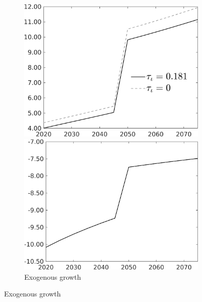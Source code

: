 \begin{figure}[h!!]
	\begin{subfigure}{0.7\textwidth}
		\caption{Exogenous growth}
		\begin{minipage}[]{0.45\textwidth}
			\includegraphics[width=1\textwidth]{../../codding_model/own_basedOnFried/optimalPol_010922_revision/figures/all_13Sept22/CompTauf_bytaul_Reg0_tauf_spillover0_nsk1_xgr0_knspil0_sep0_LFlimit1_emsbase0_countec0_GovRev0_etaa0.79_lgd1.png}
		\end{minipage}	
		\begin{minipage}[]{0.45\textwidth}
			\includegraphics[width=1\textwidth]{../../codding_model/own_basedOnFried/optimalPol_010922_revision/figures/all_13Sept22/CompTaufPER_bytaul_Reg0_tauf_spillover0_nsk0_xgr1_knspil0_sep0_LFlimit1_emsbase0_countec0_GovRev0_etaa0.79_lgd0.png} 
		\end{minipage}	
	\end{subfigure}


\end{figure}
